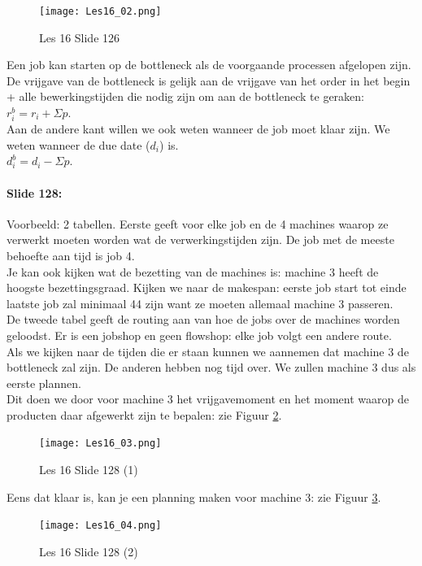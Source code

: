 \documentclass[10pt,a4paper]{report}
\begin{document}
\begin{figure}[h!]
\centering
\texttt{[image: Les16\_02.png]}
\caption{Les 16 Slide 126} 
\label{les16_02}
\end{figure}

Een job kan starten op de bottleneck als de voorgaande processen afgelopen zijn. De vrijgave van de bottleneck is gelijk aan de vrijgave van het order in het begin + alle bewerkingstijden die nodig zijn om aan de bottleneck te geraken: $r_{i}^{b} = r_{i} + \Sigma p$.\\
Aan de andere kant willen we ook weten wanneer de job moet klaar zijn. We weten wanneer de due date ($d_{i}$) is. \\
$d_{i}^{b} = d_{i} - \Sigma p$.

\paragraph{Slide 128:} Voorbeeld: 2 tabellen. Eerste geeft voor elke job en de 4 machines waarop ze verwerkt moeten worden wat de verwerkingstijden zijn. De job met de meeste behoefte aan tijd is job 4.\\
Je kan ook kijken wat de bezetting van de machines is: machine 3 heeft de hoogste bezettingsgraad. Kijken we naar de makespan: eerste job start tot einde laatste job zal minimaal 44 zijn want ze moeten allemaal machine 3 passeren. \\
De tweede tabel geeft de routing aan van hoe de jobs over de machines worden geloodst. Er is een jobshop en geen flowshop: elke job volgt een andere route.\\
Als we kijken naar de tijden die er staan kunnen we aannemen dat machine 3 de bottleneck zal zijn. De anderen hebben nog tijd over. We zullen machine 3 dus als eerste plannen. \\
Dit doen we door voor machine 3 het vrijgavemoment en het moment waarop de producten daar afgewerkt zijn te bepalen: zie Figuur \ref{les16_03}.\\

\begin{figure}[h!]
\centering
\texttt{[image: Les16\_03.png]}
\caption{Les 16 Slide 128 (1)} 
\label{les16_03}
\end{figure}

Eens dat klaar is, kan je een planning maken voor machine 3: zie Figuur \ref{les16_04}.\\

\begin{figure}[h!]
\centering
\texttt{[image: Les16\_04.png]}
\caption{Les 16 Slide 128 (2)} 
\label{les16_04}
\end{figure}
\end{document}
